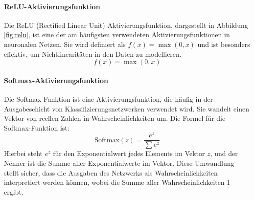 \paragraph{ReLU-Aktivierungsfunktion}
Die ReLU (Rectified Linear Unit) Aktivierungsfunktion, dargestellt in Abbildung \ref{fig:relu}, ist eine der am häufigsten verwendeten Aktivierungsfunktionen in neuronalen Netzen. Sie wird definiert als \( f(x) = \max(0, x) \) und ist besonders effektiv, um Nichtlinearitäten in den Daten zu modellieren.
%
\begin{equation} \label{eq:relu}
f(x) = \max(0, x)
\end{equation}
%

\paragraph{Softmax-Aktivierungsfunktion}
Die Softmax-Funktion ist eine Aktivierungsfunktion, die häufig in der Ausgabeschicht von Klassifizierungsnetzwerken verwendet wird. Sie wandelt einen Vektor von reellen Zahlen in Wahrscheinlichkeiten um. Die Formel für die Softmax-Funktion ist:
%
\begin{equation} \label{eq:softmax}
\text{Softmax}(z) = \frac{e^{z}}{\sum e^{z}}
\end{equation}
%
Hierbei steht \( e^{z} \) für den Exponentialwert jedes Elements im Vektor \( z \), und der Nenner ist die Summe aller Exponentialwerte im Vektor. Diese Umwandlung stellt sicher, dass die Ausgaben des Netzwerks als Wahrscheinlichkeiten interpretiert werden können, wobei die Summe aller Wahrscheinlichkeiten 1 ergibt.
%
%

